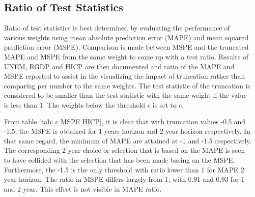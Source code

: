 \documentclass[11pt]{article}
\begin{document}
\subsection{Ratio of Test Statistics}\label{ratio-of-test-statistics}
Ratio of test statistics is best determined by evaluating the performance of various weights using mean absolute prediction error (MAPE) and mean squared prediction error (MSPE). Comparison is made between MSPE and the truncated MAPE and MSPE from the same weight to come up with a test ratio. Results of UNEM, RGDP and HICP are then documented and ratio of the MAPE and MSPE reported to assist in the visualizing the impact of truncation rather than comparing per number to the same weights. The test statistic of the truncation is considered to be smaller than the test statistic with the same weight if the value is less than 1. The weights below the threshold $c$ is set to $c$.

From table \ref{tab: c MSPE HICP}, it is clear that with truncation values -0.5 and -1.5, the MSPE is obtained for 1 years horizon and 2 year horizon respectively. In that same regard, the minimum of MAPE are attained at -1 and -1.5 respectively. The corresponding 2 year choice or selection that is based on the MAPE is seen to have collided with the selection that has been made basing on the MSPE. Furthermore, the -1.5 is the only threshold with ratio lower than 1 for MAPE 2 year horizon. The ratio in MSPE differs largely from 1, with 0.91 and 0.93 for 1 and 2 year. This effect is not visible in MAPE ratio.
\end{document}
